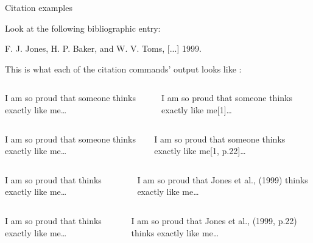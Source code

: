 \begin{frame}[fragile]{Citation examples}
	
	Look at the following bibliographic entry:
\begin{codesource}
		F. J. Jones, H. P. Baker, and W. V. Toms, [...] 1999.
\end{codesource}

	This is what each of the citation commands' output looks like :
	
	\pause
	
	\begin{columns}
		\vspace{-4.5mm}
\begin{codesource}
	I am so proud that someone thinks exactly
	like me\cite{jones99}\ldots
\end{codesource}
				I am so proud that someone thinks exactly
			like me[1]\ldots
	\end{columns}

	\begin{columns}
		\column{.49\textwidth}
		\vspace{-4.5mm}
\begin{codesource}
		I am so proud that someone thinks exactly
	like me\cite[p.22]{jones99}\ldots
\end{codesource}
		\column{.49\textwidth}
				I am so proud that someone thinks exactly
			like me[1, p.22]\ldots
		\end{columns}
	
	\pause

	\begin{columns}
		\vspace{-4.5mm}
\begin{codesource}
		I am so proud that \citet{jones99}
		thinks exactly like me\ldots
\end{codesource}
			I am so proud that Jones et al., (1999) thinks exactly like me\ldots
		\end{columns}

		\begin{columns}
		\column{.49\textwidth}
		\vspace{-4.5mm}
\begin{codesource}
	I am so proud that \citet[p.22]{jones99}
	thinks exactly like me\ldots
\end{codesource}
		\column{.49\textwidth}
			I am so proud that Jones et al., (1999, p.22) thinks exactly like me\ldots
		\end{columns}
	

\end{frame}
